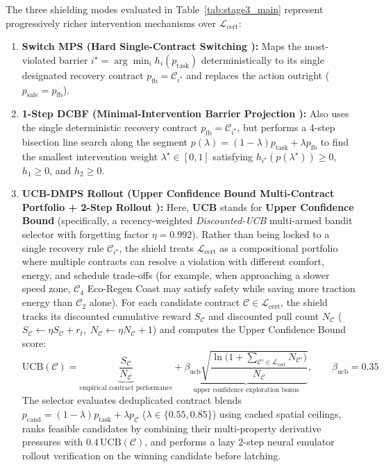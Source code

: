 \documentclass[10pt,a4paper]{article}
\begin{document}
The three shielding modes evaluated in Table~\ref{tab:stage3_main} represent progressively richer intervention mechanisms over $\mathcal{L}_{\text{cert}}$:
\begin{enumerate}
    \item \textbf{Switch MPS (Hard Single-Contract Switching \cite{banerjee2024,goodall2026}):} Maps the most-violated barrier $i^\star = \arg\min_i h_i(p_{\text{task}})$ deterministically to its single designated recovery contract $p_{\text{fb}} = \mathcal{C}_{i^\star}$ and replaces the action outright ($p_{\text{safe}} = p_{\text{fb}}$).
    \item \textbf{1-Step DCBF (Minimal-Intervention Barrier Projection \cite{hsu2024,wang2023}):} Also uses the single deterministic recovery contract $p_{\text{fb}} = \mathcal{C}_{i^\star}$, but performs a 4-step bisection line search along the segment $p(\lambda) = (1 - \lambda)p_{\text{task}} + \lambda p_{\text{fb}}$ to find the smallest intervention weight $\lambda^\star \in [0, 1]$ satisfying $h_{i^\star}(p(\lambda^\star)) \ge 0$, $h_1 \ge 0$, and $h_2 \ge 0$.
    \item \textbf{UCB-DMPS Rollout (Upper Confidence Bound Multi-Contract Portfolio + 2-Step Rollout \cite{adalat2026a,banerjee2024}):} Here, \textbf{UCB} stands for \textbf{Upper Confidence Bound} (specifically, a recency-weighted \textit{Discounted-UCB} multi-armed bandit selector with forgetting factor $\eta = 0.992$). Rather than being locked to a single recovery rule $\mathcal{C}_{i^\star}$, the shield treats $\mathcal{L}_{\text{cert}}$ as a compositional portfolio where multiple contracts can resolve a violation with different comfort, energy, and schedule trade-offs (for example, when approaching a slower speed zone, $\mathcal{C}_4$ Eco-Regen Coast may satisfy safety while saving more traction energy than $\mathcal{C}_2$ alone). For each candidate contract $\mathcal{C} \in \mathcal{L}_{\text{cert}}$, the shield tracks its discounted cumulative reward $S_{\mathcal{C}}$ and discounted pull count $N_{\mathcal{C}}$ ($S_{\mathcal{C}} \leftarrow \eta S_{\mathcal{C}} + r_t,\; N_{\mathcal{C}} \leftarrow \eta N_{\mathcal{C}} + 1$) and computes the Upper Confidence Bound score:
    \begin{equation}
        \text{UCB}(\mathcal{C}) = \underbrace{\frac{S_{\mathcal{C}}}{N_{\mathcal{C}}}}_{\text{empirical contract performance}} + \underbrace{\beta_{\text{ucb}}\sqrt{\frac{\ln\!\big(1 + \sum_{\mathcal{C}' \in \mathcal{L}_{\text{cert}}} N_{\mathcal{C}'}\big)}{N_{\mathcal{C}}}}}_{\text{upper confidence exploration bonus}}, \qquad \beta_{\text{ucb}} = 0.35
        \label{eq:ucb_score}
    \end{equation}
    The selector evaluates deduplicated contract blends $p_{\text{cand}} = (1 - \lambda)p_{\text{task}} + \lambda p_{\mathcal{C}}$ ($\lambda \in \{0.55, 0.85\}$) using cached spatial ceilings, ranks feasible candidates by combining their multi-property derivative pressures with $0.4\,\text{UCB}(\mathcal{C})$, and performs a lazy 2-step neural emulator rollout verification on the winning candidate before latching.
\end{enumerate}
\end{document}
